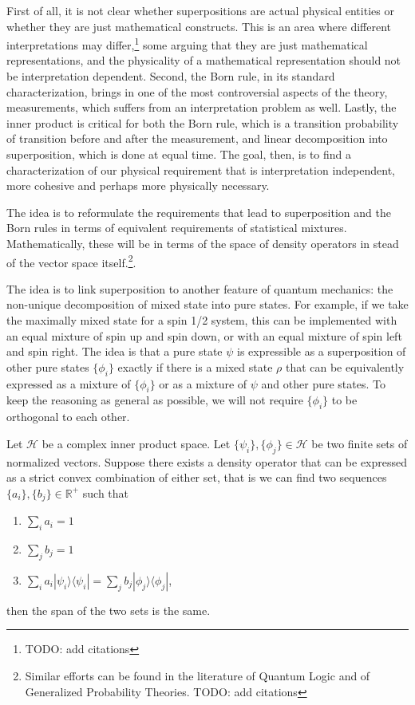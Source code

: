 \documentclass[10pt,twocolumn, nofootinbib]{revtex4-2}
\def\>{\rangle}
\def\<{\langle}
\begin{document}
First of all, it is not clear whether superpositions are actual physical entities or whether they are just mathematical constructs. This is an area where different interpretations may differ,\footnote{TODO: add citations} some arguing that they are just mathematical representations, and the physicality of a mathematical representation should not be interpretation dependent. Second, the Born rule, in its standard characterization, brings in one of the most controversial aspects of the theory, measurements, which suffers from an interpretation problem as well. Lastly, the inner product is critical for both the Born rule, which is a transition probability of transition before and after the measurement, and linear decomposition into superposition, which is done at equal time. The goal, then, is to find a characterization of our physical requirement that is interpretation independent, more cohesive and perhaps more physically necessary.

The idea is to reformulate the requirements that lead to superposition and the Born rules in terms of equivalent requirements of statistical mixtures. Mathematically, these will be in terms of the space of density operators in stead of the vector space itself.\footnote{Similar efforts can be found in the literature of Quantum Logic and of Generalized Probability Theories. TODO: add citations}.

The idea is to link superposition to another feature of quantum mechanics: the non-unique decomposition of mixed state into pure states. For example, if we take the maximally mixed state for a spin 1/2 system, this can be implemented with an equal mixture of spin up and spin down, or with an equal mixture of spin left and spin right. The idea is that a pure state $\psi$ is expressible as a superposition of other pure states $\{\phi_i\}$ exactly if there is a mixed state $\rho$ that can be equivalently expressed as a mixture of $\{\phi_i\}$ or as a mixture of $\psi$ and other pure states. To keep the reasoning as general as possible, we will not require $\{\phi_i\}$ to be orthogonal to each other.

\begin{prop}\label{prop_densitySpan}
	Let $\mathcal{H}$ be a complex inner product space. Let $\{\psi_i\}, \{\phi_j\} \in \mathcal{H}$ be two finite sets of normalized vectors. Suppose there exists a density operator that can be expressed as a strict convex combination of either set, that is we can find two sequences $\{a_i\}, \{b_j\} \in \mathbb{R}^+$ such that
	\begin{enumerate}
		\item $\sum_i a_i = 1$
		\item $\sum_j b_j = 1$
		\item $\sum_i a_i |\psi_i\>\<\psi_i| = \sum_j b_j |\phi_j\>\<\phi_j|$,
	\end{enumerate}
	then the span of the two sets is the same.
\end{prop}
\end{document}
